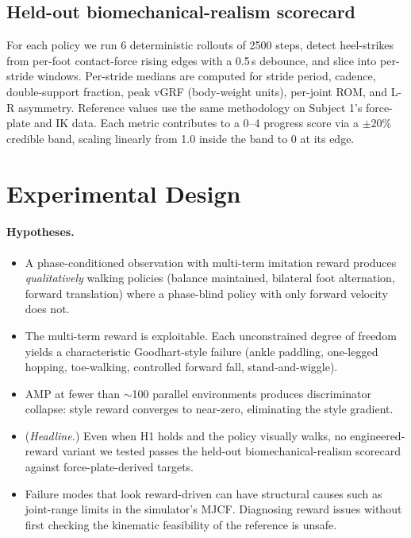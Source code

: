 \documentclass{article}
\begin{document}
\subsection{Held-out biomechanical-realism scorecard}
\label{sec:scorecard-method}

For each policy we run 6 deterministic rollouts of 2500 steps,
detect heel-strikes from per-foot contact-force rising edges with
a 0.5\,s debounce, and slice into per-stride windows. Per-stride
medians are computed for stride period, cadence, double-support
fraction, peak vGRF (body-weight units), per-joint ROM, and L-R
asymmetry. Reference values use the same methodology on Subject
1's force-plate and IK data. Each metric contributes to a 0--4
progress score via a $\pm 20\%$ credible band, scaling linearly
from 1.0 inside the band to 0 at its edge.

\section{Experimental Design}
\label{sec:experiments}

\paragraph{Hypotheses.}
\begin{itemize}
\itemsep0em
  \item[\textbf{H1.}] A phase-conditioned observation with multi-term
        imitation reward produces \emph{qualitatively} walking
        policies (balance maintained, bilateral foot alternation,
        forward translation) where a phase-blind policy with only
        forward velocity does not.
  \item[\textbf{H2.}] The multi-term reward is exploitable. Each
        unconstrained degree of freedom yields a characteristic
        Goodhart-style failure (ankle paddling, one-legged hopping,
        toe-walking, controlled forward fall, stand-and-wiggle).
  \item[\textbf{H3.}] AMP at fewer than $\sim$100 parallel environments
        produces discriminator collapse: style reward converges to
        near-zero, eliminating the style gradient.
  \item[\textbf{H4.}] (\emph{Headline.}) Even when H1 holds and the
        policy visually walks, no engineered-reward variant we tested
        passes the held-out biomechanical-realism scorecard against
        force-plate-derived targets.
  \item[\textbf{H5.}] Failure modes that look reward-driven can have
        structural causes such as joint-range limits in the
        simulator's MJCF. Diagnosing reward issues without first
        checking the kinematic feasibility of the reference is
        unsafe.
\end{itemize}
\end{document}
